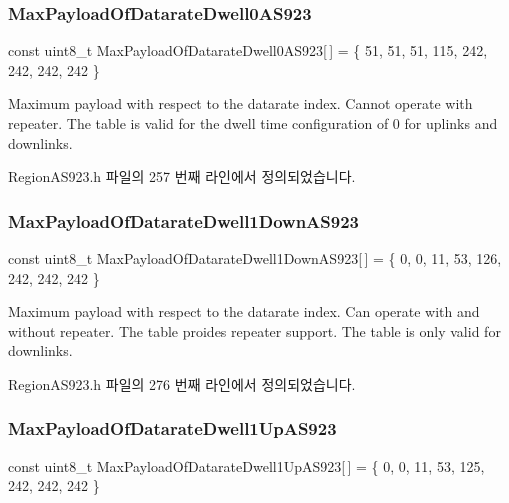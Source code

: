 \subsubsection{\texorpdfstring{Max\+Payload\+Of\+Datarate\+Dwell0\+A\+S923}{MaxPayloadOfDatarateDwell0AS923}}
{\footnotesize\ttfamily const uint8\+\_\+t Max\+Payload\+Of\+Datarate\+Dwell0\+A\+S923\mbox{[}$\,$\mbox{]} = \{ 51, 51, 51, 115, 242, 242, 242, 242 \}\hspace{0.3cm}{\ttfamily [static]}}

Maximum payload with respect to the datarate index. Cannot operate with repeater. The table is valid for the dwell time configuration of 0 for uplinks and downlinks. 

Region\+A\+S923.\+h 파일의 257 번째 라인에서 정의되었습니다.

\mbox{\label{group___r_e_g_i_o_n_a_s923_ga94c244742090896403b892f3a59d1e0d}} 
\subsubsection{\texorpdfstring{Max\+Payload\+Of\+Datarate\+Dwell1\+Down\+A\+S923}{MaxPayloadOfDatarateDwell1DownAS923}}
{\footnotesize\ttfamily const uint8\+\_\+t Max\+Payload\+Of\+Datarate\+Dwell1\+Down\+A\+S923\mbox{[}$\,$\mbox{]} = \{ 0, 0, 11, 53, 126, 242, 242, 242 \}\hspace{0.3cm}{\ttfamily [static]}}

Maximum payload with respect to the datarate index. Can operate with and without repeater. The table proides repeater support. The table is only valid for downlinks. 

Region\+A\+S923.\+h 파일의 276 번째 라인에서 정의되었습니다.

\mbox{\label{group___r_e_g_i_o_n_a_s923_ga4c06b82286a6f12c7b31022b3068a290}} 
\subsubsection{\texorpdfstring{Max\+Payload\+Of\+Datarate\+Dwell1\+Up\+A\+S923}{MaxPayloadOfDatarateDwell1UpAS923}}
{\footnotesize\ttfamily const uint8\+\_\+t Max\+Payload\+Of\+Datarate\+Dwell1\+Up\+A\+S923\mbox{[}$\,$\mbox{]} = \{ 0, 0, 11, 53, 125, 242, 242, 242 \}\hspace{0.3cm}{\ttfamily [static]}}

